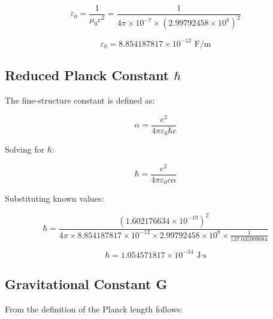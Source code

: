 \documentclass[12pt,a4paper]{article}
\theoremstyle{definition}
\begin{document}
	\begin{equation}
		\varepsilon_0 = \frac{1}{\mu_0 c^2} = \frac{1}{4\pi \times 10^{-7} \times (2.99792458 \times 10^8)^2}
	\end{equation}
	
	\begin{tcolorbox}[colback=green!5!white,colframe=green!75!black,title=Vacuum Permittivity]
		\begin{equation}
			\boxed{\varepsilon_0 = 8.854187817 \times 10^{-12} \text{ F/m}}
		\end{equation}
	\end{tcolorbox}
	
	\subsection{Reduced Planck Constant $\hbar$}
	
	The fine-structure constant is defined as:
	
	\begin{equation}
		\alpha = \frac{e^2}{4\pi\varepsilon_0\hbar c}
	\end{equation}
	
	Solving for $\hbar$:
	
	\begin{equation}
		\hbar = \frac{e^2}{4\pi\varepsilon_0 c \alpha}
	\end{equation}
	
	Substituting known values:
	
	\begin{equation}
		\hbar = \frac{(1.602176634 \times 10^{-19})^2}{4\pi \times 8.854187817 \times 10^{-12} \times 2.99792458 \times 10^8 \times \frac{1}{137.035999084}}
	\end{equation}
	
	\begin{tcolorbox}[colback=green!5!white,colframe=green!75!black,title=Reduced Planck Constant]
		\begin{equation}
			\boxed{\hbar = 1.054571817 \times 10^{-34} \text{ J·s}}
		\end{equation}
	\end{tcolorbox}
	
	\subsection{Gravitational Constant G}
	
	From the definition of the Planck length follows:
	
\end{document}

